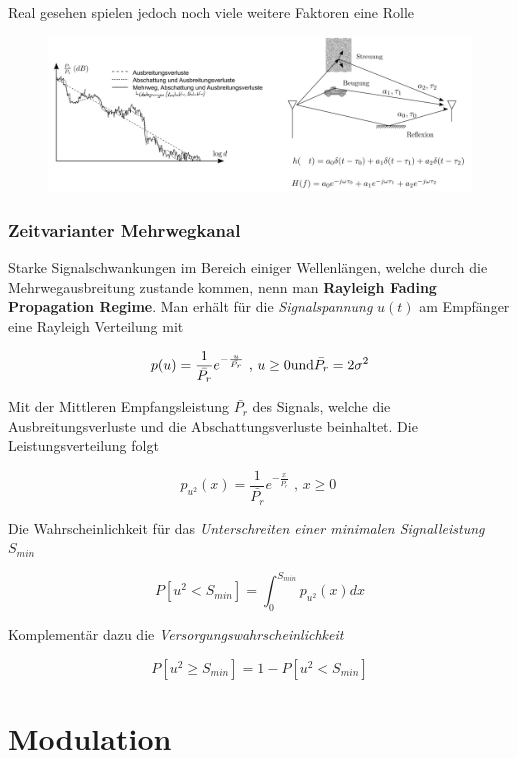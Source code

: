 \documentclass[
  10pt,
  a4paper,
  german]{article}
\numberwithin{equation}{section}
\begin{document}
Real gesehen spielen jedoch noch viele weitere Faktoren eine Rolle

\begin{figure}[H]

{\centering \includegraphics{images/04_RealDaempfung.png}

}

\end{figure}

\hypertarget{zeitvarianter-mehrwegkanal}{%
\subsubsection{Zeitvarianter
Mehrwegkanal}\label{zeitvarianter-mehrwegkanal}}

Starke Signalschwankungen im Bereich einiger Wellenlängen, welche durch
die Mehrwegausbreitung zustande kommen, nenn man \textbf{Rayleigh Fading
Propagation Regime}. Man erhält für die \emph{Signalspannung} \(u(t)\)
am Empfänger eine Rayleigh Verteilung mit

\[
p(u)=\frac{1}{\bar{P_r}}e^{-\frac{u}{\bar{P_r}}}\text{ , }u\geq0\space\space\text{und}\space\space\bar{P_r}=2\sigma^2
\]

Mit der Mittleren Empfangsleistung \(\bar{P_r}\) des Signals, welche die
Ausbreitungsverluste und die Abschattungsverluste beinhaltet. Die
Leistungsverteilung folgt

\[
p_{u^2}(x)=\frac{1}{\bar{P_r}}e^{-\frac{x}{\bar{P_r}}}\text{ , }x\geq0\
\]

Die Wahrscheinlichkeit für das \emph{Unterschreiten einer minimalen
Signalleistung} \(S_{min}\)

\[
P[u^2<S_{min}]=\int_0^{S_{min}}{p_{u^2}(x)dx}
\]

Komplementär dazu die \emph{Versorgungswahrscheinlichkeit}

\[
P[u^2\geq S_{min}]=1-P[u^2<S_{min}]
\]

\hypertarget{modulation}{%
\section{Modulation}\label{modulation}}
\end{document}
